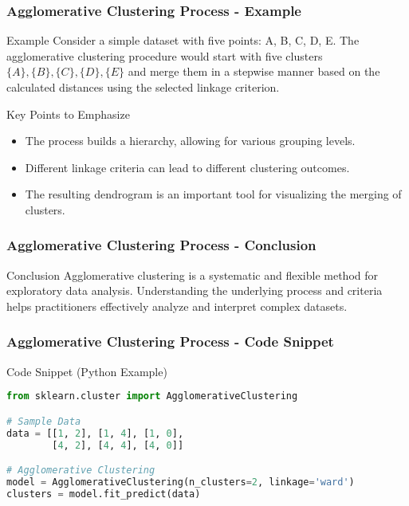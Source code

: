 \documentclass[aspectratio=169]{beamer}
\begin{document}
\begin{frame}[fragile]
    \frametitle{Agglomerative Clustering Process - Example}
    \begin{block}{Example}
        Consider a simple dataset with five points: A, B, C, D, E. The agglomerative clustering procedure would start with five clusters \(\{A\}, \{B\}, \{C\}, \{D\}, \{E\}\) and merge them in a stepwise manner based on the calculated distances using the selected linkage criterion.
    \end{block}
    
    \begin{block}{Key Points to Emphasize}
        \begin{itemize}
            \item The process builds a hierarchy, allowing for various grouping levels.
            \item Different linkage criteria can lead to different clustering outcomes.
            \item The resulting dendrogram is an important tool for visualizing the merging of clusters.
        \end{itemize}
    \end{block}
\end{frame}

\begin{frame}[fragile]
    \frametitle{Agglomerative Clustering Process - Conclusion}
    \begin{block}{Conclusion}
        Agglomerative clustering is a systematic and flexible method for exploratory data analysis. Understanding the underlying process and criteria helps practitioners effectively analyze and interpret complex datasets.
    \end{block}
\end{frame}

\begin{frame}[fragile]
    \frametitle{Agglomerative Clustering Process - Code Snippet}
    \begin{block}{Code Snippet (Python Example)}
    \begin{lstlisting}[language=Python]
from sklearn.cluster import AgglomerativeClustering

# Sample Data
data = [[1, 2], [1, 4], [1, 0],
        [4, 2], [4, 4], [4, 0]]

# Agglomerative Clustering
model = AgglomerativeClustering(n_clusters=2, linkage='ward')
clusters = model.fit_predict(data)
    \end{lstlisting}
    \end{block}
\end{frame}
\end{document}

